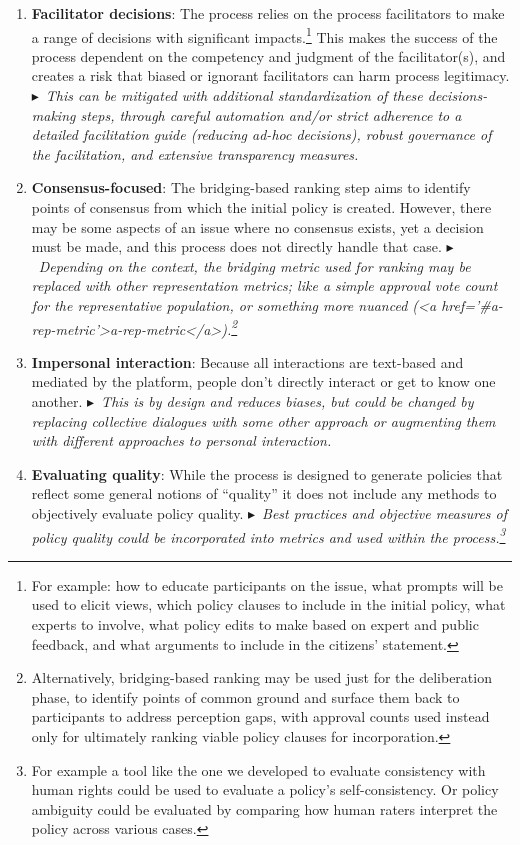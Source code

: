 \documentclass{article}
\begin{document}
\begin{enumerate}
\item 
\textbf{Facilitator decisions}: The process relies on the process facilitators to make a range of decisions with significant impacts.\footnote{For example: how to educate participants on the issue, what prompts will be used to elicit views, which policy clauses to include in the initial policy, what experts to involve, what policy edits to make based on expert and public feedback, and what arguments to include in the citizens’ statement.} This makes the success of the process dependent on the competency and judgment of the facilitator(s), and creates a risk that biased or ignorant facilitators can harm process legitimacy. $\blacktriangleright$~\emph{This can be mitigated with additional standardization of these decisions-making steps, through careful automation and/or strict adherence to a detailed facilitation guide (reducing ad-hoc decisions), robust governance of the facilitation, and extensive transparency measures.}

\item 
\textbf{Consensus-focused}: The bridging-based ranking step aims to identify points of consensus from which the initial policy is created. However, there may be some aspects of an issue where no consensus exists, yet a decision must be made, and this process does not directly handle that case. $\blacktriangleright$~\emph{Depending on the context, the bridging metric used for ranking may be replaced with other representation metrics; like a simple approval vote count for the representative population, or something more nuanced (<a href='#a-rep-metric'>a-rep-metric</a>).\footnote{Alternatively, bridging-based ranking may be used just for the deliberation phase, to identify points of common ground and surface them back to participants to address perception gaps, with approval counts used instead only for ultimately ranking viable policy clauses for incorporation.}}

\item 
\textbf{Impersonal interaction}: Because all interactions are text-based and mediated by the platform, people don't directly interact or get to know one another. $\blacktriangleright$~\emph{This is by design and reduces biases, but could be changed by replacing collective dialogues with some other approach or augmenting them with different approaches to personal interaction.}

\item 
\textbf{Evaluating quality}: While the process is designed to generate policies that reflect some general notions of “quality” it does not include any methods to objectively evaluate policy quality.
$\blacktriangleright$~\emph{Best practices and objective measures of policy quality could be incorporated into metrics and used within the process.\footnote{For example a tool like the one we developed to evaluate consistency with human rights could be used to evaluate a policy's self-consistency. Or policy ambiguity could be evaluated by comparing how human raters interpret the policy across various cases.}} 
\end{enumerate}
\end{document}
